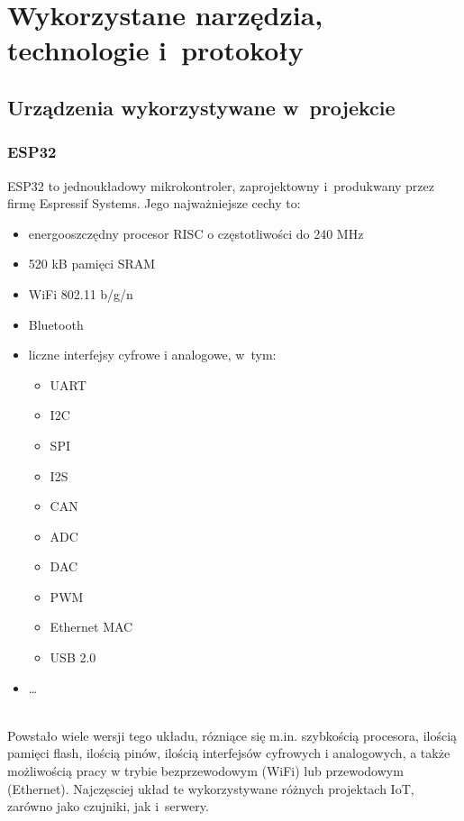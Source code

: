 
\chapter{Wykorzystane narzędzia, technologie i~protokoły}

\section{Urządzenia wykorzystywane w~projekcie}
\subsection{ESP32}
ESP32 to jednoukładowy mikrokontroler, zaprojektowny i~produkwany przez firmę Espressif Systems. Jego najważniejsze cechy to:
\begin{itemize}
    \item energooszczędny procesor RISC o częstotliwości do 240 MHz
    \item 520 kB pamięci SRAM
    \item WiFi 802.11 b/g/n
    \item Bluetooth
    \item liczne interfejsy cyfrowe i analogowe, w~tym:
          \begin{itemize}
              \item UART
              \item I2C
              \item SPI
              \item I2S
              \item CAN
              \item ADC
              \item DAC
              \item PWM
              \item Ethernet MAC
              \item USB 2.0
          \end{itemize}
    \item \dots
\end{itemize} \cite{ESP32:datasheet} \\
Powstało wiele wersji tego układu, rózniące się m.in. szybkością procesora, ilością pamięci flash, ilością pinów, ilością interfejsów cyfrowych i analogowych, a także możliwością pracy w trybie bezprzewodowym (WiFi) lub przewodowym (Ethernet)\cite{ESP32:socs}.
Najczęsciej układ te wykorzystywane różnych projektach IoT, zarówno jako czujniki, jak i~serwery.\cite{ESP32:datasheet}
